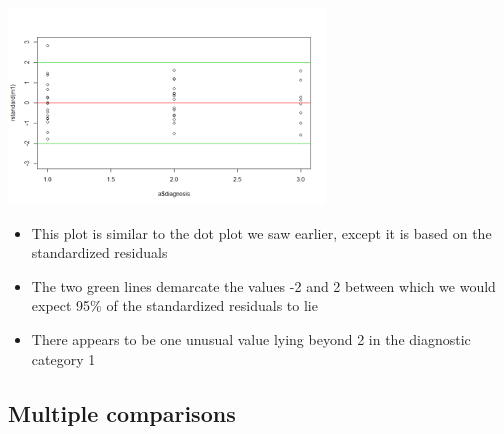 \documentclass[
]{book}
\providecommand{\tightlist}{%
  \setlength{\itemsep}{0pt}\setlength{\parskip}{0pt}}
\begin{document}
\includegraphics[width=0.5\linewidth]{./10_46}

\begin{itemize}
\tightlist
\item
  This plot is similar to the dot plot we saw earlier, except it is based on the standardized residuals
\item
  The two green lines demarcate the values -2 and 2 between which we would expect 95\% of the standardized residuals to lie
\item
  There appears to be one unusual value lying beyond 2 in the diagnostic category 1
\end{itemize}

\hypertarget{multiple-comparisons}{%
\subsection{Multiple comparisons}\label{multiple-comparisons}}
\end{document}
